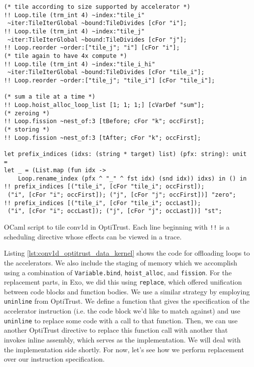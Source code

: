 \documentclass[acmsmall, nonacm=true]{acmart}
\begin{document}
\begin{listing}
\begin{verbatim}
(* tile according to size supported by accelerator *)
!! Loop.tile (trm_int 4) ~index:"tile_i"
 ~iter:TileIterGlobal ~bound:TileDivides [cFor "i"];
!! Loop.tile (trm_int 4) ~index:"tile_j"
 ~iter:TileIterGlobal ~bound:TileDivides [cFor "j"];
!! Loop.reorder ~order:["tile_j"; "i"] [cFor "i"];
(* tile again to have 4x compute *)
!! Loop.tile (trm_int 4) ~index:"tile_i_hi"
 ~iter:TileIterGlobal ~bound:TileDivides [cFor "tile_i"];
!! Loop.reorder ~order:["tile_j"; "tile_i"] [cFor "tile_i"];

(* sum a tile at a time *)
!! Loop.hoist_alloc_loop_list [1; 1; 1;] [cVarDef "sum"];
(* zeroing *)
!! Loop.fission ~nest_of:3 [tBefore; cFor "k"; occFirst];
(* storing *)
!! Loop.fission ~nest_of:3 [tAfter; cFor "k"; occFirst];

let prefix_indices (idxs: (string * target) list) (pfx: string): unit =
let _ = (List.map (fun idx -> 
    Loop.rename_index (pfx ^ "_" ^ fst idx) (snd idx)) idxs) in () in
!! prefix_indices [("tile_i", [cFor "tile_i"; occFirst]);
 ("i", [cFor "i"; occFirst]); ("j", [cFor "j"; occFirst])] "zero";
!! prefix_indices [("tile_i", [cFor "tile_i"; occLast]);
 ("i", [cFor "i"; occLast]); ("j", [cFor "j"; occLast])] "st";

\end{verbatim}
\caption{OCaml script to tile conv1d in OptiTrust. Each line beginning with \texttt{!!} is a scheduling directive whose effects can be viewed in a trace.}
\label{lst:conv1d_optitrust_tile}
\end{listing}

Listing \ref{lst:conv1d_optitrust_data_kernel} shows the code for offloading loops to the accelerators. We also include the staging of memory which we accomplish using a combination of \verb|Variable.bind|, \verb|hoist_alloc|, and \verb|fission|. For the replacement parts, in Exo, we did this using \verb|replace|, which offered unification between code blocks and function bodies. We use a similar strategy by employing \verb|uninline| from OptiTrust. We define a function that gives the specification of the accelerator instruction (i.e. the code block we'd like to match against) and use \verb|uninline| to replace some code with a call to that function. Then, we can use another OptiTrust directive to replace this function call with another that invokes inline assembly, which serves as the implementation. We will deal with the implementation side shortly. For now, let's see how we perform replacement over our instruction specification.
\end{document}
